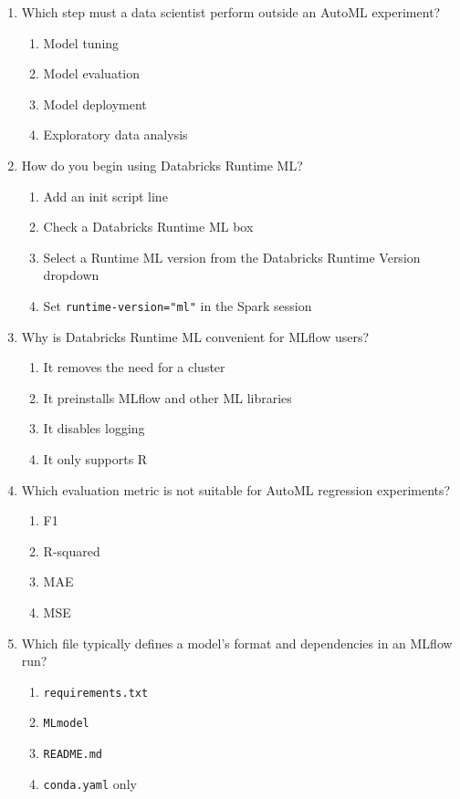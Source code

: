 \documentclass[11pt]{article}
\begin{document}
\begin{enumerate}[leftmargin=*, label=\textbf{Q\arabic*.}]
		\item Which step must a data scientist perform outside an AutoML experiment?
		\begin{enumerate}[label=(\alph*)]
			\item Model tuning
			\item Model evaluation
			\item Model deployment
			\item Exploratory data analysis
		\end{enumerate}
		
		\item How do you begin using Databricks Runtime ML?
		\begin{enumerate}[label=(\alph*)]
			\item Add an init script line
			\item Check a Databricks Runtime ML box
			\item Select a Runtime ML version from the Databricks Runtime Version dropdown
			\item Set \texttt{runtime-version="ml"} in the Spark session
		\end{enumerate}
		
		\item Why is Databricks Runtime ML convenient for MLflow users?
		\begin{enumerate}[label=(\alph*)]
			\item It removes the need for a cluster
			\item It preinstalls MLflow and other ML libraries
			\item It disables logging
			\item It only supports R
		\end{enumerate}
		
		\item Which evaluation metric is not suitable for AutoML regression experiments?
		\begin{enumerate}[label=(\alph*)]
			\item F1
			\item R-squared
			\item MAE
			\item MSE
		\end{enumerate}
		
		\item Which file typically defines a model's format and dependencies in an MLflow run?
		\begin{enumerate}[label=(\alph*)]
			\item \texttt{requirements.txt}
			\item \texttt{MLmodel}
			\item \texttt{README.md}
			\item \texttt{conda.yaml} only
		\end{enumerate}
		

\end{enumerate}
\end{document}
